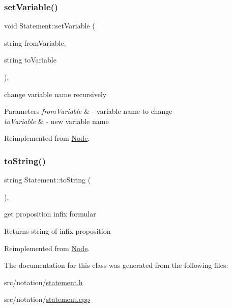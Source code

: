 \mbox{\label{class_statement_a96d67118f27e64d72b189d837103a126}} 
\subsubsection{\texorpdfstring{set\+Variable()}{setVariable()}}
{\footnotesize\ttfamily void Statement\+::set\+Variable (\begin{DoxyParamCaption}\item[{string}]{from\+Variable,  }\item[{string}]{to\+Variable }\end{DoxyParamCaption})\hspace{0.3cm}{\ttfamily [override]}, {\ttfamily [virtual]}}



change variable name recursively 


\begin{DoxyParams}{Parameters}
{\em from\+Variable} & -\/ variable name to change \\
\hline
{\em to\+Variable} & -\/ new variable name \\
\hline
\end{DoxyParams}


Reimplemented from \hyperlink{class_node_ae9bb2ba5b99e08fcd6f9aff0814a740f}{Node}.

\mbox{\label{class_statement_a0e9ec611dc39c53ed01cf0f877db9881}} 
\subsubsection{\texorpdfstring{to\+String()}{toString()}}
{\footnotesize\ttfamily string Statement\+::to\+String (\begin{DoxyParamCaption}{ }\end{DoxyParamCaption})\hspace{0.3cm}{\ttfamily [override]}, {\ttfamily [virtual]}}



get proposition infix formular 

\begin{DoxyReturn}{Returns}
string of infix proposition 
\end{DoxyReturn}


Reimplemented from \hyperlink{class_node_a0746502074a232243dcac3b96f3ce2d0}{Node}.



The documentation for this class was generated from the following files\+:\begin{DoxyCompactItemize}
\item 
src/notation/\hyperlink{statement_8h}{statement.\+h}\item 
src/notation/\hyperlink{statement_8cpp}{statement.\+cpp}\end{DoxyCompactItemize}
